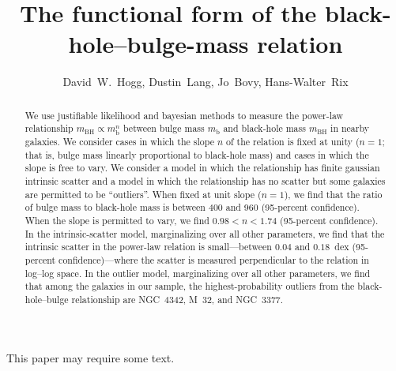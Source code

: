 \documentclass[12pt,preprint]{aastex}
\newcounter{address}
\newcommand{\mbulge}{m_{\mathrm{b}}}
\newcommand{\mbh}{m_{\mathrm{BH}}}
\newcommand{\slope}{n}
\begin{document}
\title{The functional form of the black-hole--bulge-mass relation}
\author{David~W.~Hogg\altaffilmark{\ref{CCPP},\ref{MPIA},\ref{email}},
        Dustin~Lang\altaffilmark{\ref{UofT},\ref{Princeton}},
        Jo~Bovy\altaffilmark{\ref{CCPP}},
        Hans-Walter~Rix\altaffilmark{\ref{MPIA}}}

\begin{abstract}
We use justifiable likelihood and bayesian methods to measure the
power-law relationship $\mbh\propto\mbulge^\slope$ between bulge mass
$\mbulge$ and black-hole mass $\mbh$ in nearby galaxies.  We consider
cases in which the slope $\slope$ of the relation is fixed at unity
($\slope=1$; that is, bulge mass linearly proportional to black-hole
mass) and cases in which the slope is free to vary.  We consider a
model in which the relationship has finite gaussian intrinsic scatter
and a model in which the relationship has no scatter but some galaxies
are permitted to be ``outliers''.  When fixed at unit slope
($\slope=1$), we find that the ratio of bulge mass to black-hole mass
is between 400 and 960 (95-percent confidence).  When the slope is
permitted to vary, we find $0.98<\slope<1.74$ (95-percent confidence).
In the intrinsic-scatter model, marginalizing over all other
parameters, we find that the intrinsic scatter in the power-law
relation is small---between $0.04$ and $0.18$~dex (95-percent
confidence)---where the scatter is measured perpendicular to the
relation in log--log space.  In the outlier model, marginalizing over
all other parameters, we find that among the galaxies in our sample,
the highest-probability outliers from the black-hole--bulge
relationship are NGC~4342, M~32, and NGC~3377.
\end{abstract}

This paper may require some text.
\end{document}
